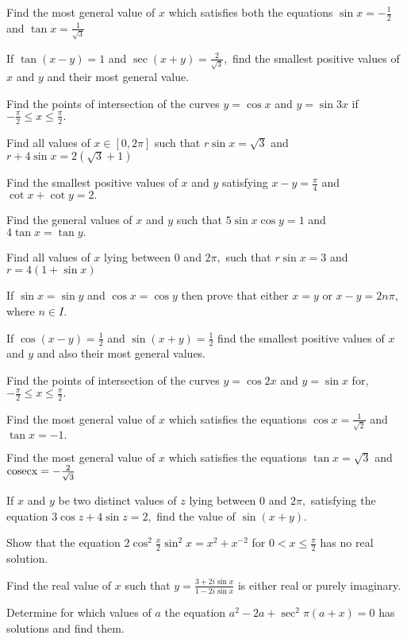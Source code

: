 \item Find the most general value of $x$ which satisfies both the equations $\sin x= -\frac{1}{2}$ and $\tan x =
    \frac{1}{\sqrt{3}}$
\item If $\tan(x - y) = 1$ and $\sec(x + y) = \frac{2}{\sqrt{3}},$ find the smallest positive values of $x$ and
    $y$ and their most general value.
\item Find the points of intersection of the curves $y = \cos x$ and $y = \sin 3x$ if $-\frac{\pi}{2}\leq x\leq
    \frac{\pi}{2}.$
\item Find all values of $x\in [0, 2\pi]$ such that $r\sin x = \sqrt{3}$ and $r + 4\sin x = 2(\sqrt{3} + 1)$
\item Find the smallest positive values of $x$ and $y$ satisfying $x - y = \frac{\pi}{4}$ and $\cot x + \cot
    y = 2.$
\item Find the general values of $x$ and $y$ such that $5\sin x\cos y = 1$ and $4\tan x = \tan y.$
\item Find all values of $x$ lying between $0$ and $2\pi,$ such that $r\sin x = 3$ and $r = 4(1 + \sin
    x)$
\item If $\sin x = \sin y$ and $\cos x = \cos y$ then prove that either $x = y$ or $x - y = 2n\pi,$ where
    $n\in I.$
\item If $\cos(x - y) = \frac{1}{2}$ and $\sin(x + y) = \frac{1}{2}$ find the smallest positive values of $x$ and
    $y$ and also their most general values.
\item Find the points of intersection of the curves $y = \cos 2x$ and $y = \sin x$ for, $-\frac{\pi}{2}\leq x\leq
    \frac{\pi}{2}.$
\item Find the most general value of $x$ which satisfies the equations $\cos x = \frac{1}{\sqrt{2}}$ and $\tan x = -1.$
\item Find the most general value of $x$ which satisfies the equations $\tan x = \sqrt{3}$ and $\rm cosec x =
    -\frac{2}{\sqrt{3}}$
\item If $x$ and $y$ be two distinct values of $z$ lying between $0$ and $2\pi,$ satisfying the
    equation $3\cos z + 4\sin z = 2,$ find the value of $\sin(x + y).$
\item Show that the equation $2\cos^2\frac{x}{2}\sin^2x = x^2+ x^{-2}$ for $0<x\leq\frac{\pi}{2}$ has no real solution.
\item Find the real value of $x$ such that $y = \frac{3 + 2i\sin x}{1 - 2i\sin x}$ is either real or purely imaginary.
\item Determine for which values of $a$ the equation $a^2 - 2a + \sec^2\pi(a + x) = 0$ has solutions and find them.
